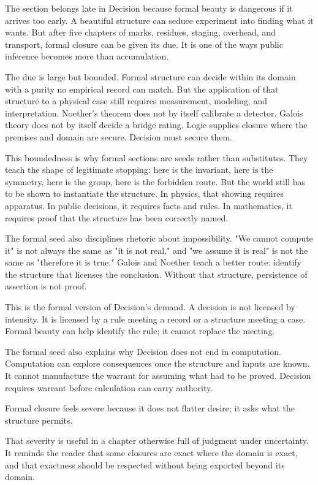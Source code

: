 The section belongs late in Decision because formal beauty is dangerous if
it arrives too early. A beautiful structure can seduce experiment into
finding what it wants. But after five chapters of marks, residues, staging,
overhead, and transport, formal closure can be given its due. It is one of
the ways public inference becomes more than accumulation.

The due is large but bounded. Formal structure can decide within its domain
with a purity no empirical record can match. But the application of that
structure to a physical case still requires measurement, modeling, and
interpretation. Noether's theorem does not by itself calibrate a detector.
Galois theory does not by itself decide a bridge rating. Logic supplies
closure where the premises and domain are secure. Decision must secure them.

This boundedness is why formal sections are seeds rather than substitutes.
They teach the shape of legitimate stopping: here is the invariant, here is
the symmetry, here is the group, here is the forbidden route. But the world
still has to be shown to instantiate the structure. In physics, that showing
requires apparatus. In public decisions, it requires facts and rules. In
mathematics, it requires proof that the structure has been correctly named.

The formal seed also disciplines rhetoric about impossibility. "We cannot
compute it" is not always the same as "it is not real," and "we assume it is
real" is not the same as "therefore it is true." Galois and Noether teach a
better route: identify the structure that licenses the conclusion. Without
that structure, persistence of assertion is not proof.

This is the formal version of Decision's demand. A decision is not
licensed by intensity. It is licensed by a rule meeting a record or a
structure meeting a case. Formal beauty can help identify the rule; it cannot
replace the meeting.

The formal seed also explains why Decision does not end in computation.
Computation can explore consequences once the structure and inputs are known.
It cannot manufacture the warrant for assuming what had to be proved. Decision
requires warrant before calculation can carry authority.

Formal closure feels severe because it does not flatter desire; it asks
what the structure permits.

That severity is useful in a chapter otherwise full of judgment under
uncertainty. It reminds the reader that some closures are exact where the
domain is exact, and that exactness should be respected without being
exported beyond its domain.


